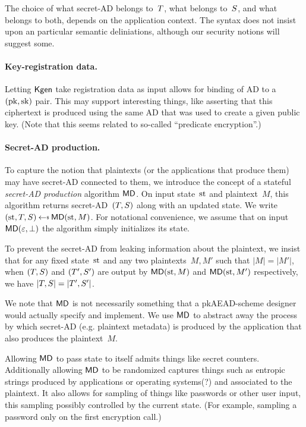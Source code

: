 The choice of what secret-AD belongs to~$T$, what belongs to~$S$, and what belongs to both, depends on the application context.  The syntax does not insist upon an particular semantic deliniations, although our security notions will suggest some.


\paragraph{Key-registration data. } Letting $\mathsf{Kgen}$ take registration data as input allows for binding of AD to a $(\mathrm{pk},\mathrm{sk})$ pair.  This may support interesting things, like asserting that this ciphertext is produced using the same AD that was used to create a given public key.  (Note that this seems related to so-called ``predicate encryption''.)


\paragraph{Secret-AD production. } To capture the notion that plaintexts (or the applications that produce them) may have secret-AD connected to them, we introduce the concept of a stateful \emph{secret-AD production} algorithm $\mathsf{MD}$.  On input state~$\mathrm{st}$ and plaintext~$M$, this algorithm returns secret-AD~$(T,S)$ along with an updated state.  We write $(\st,\umd,\rmd) \getsr \mdalg(\st,M)$.  
For notational convenience, we assume that on input $\mathsf{MD}(\varepsilon,\bot)$ the algorithm simply initializes its state. 

To prevent the secret-AD from leaking information about the plaintext, we insist that for any fixed state~$\mathrm{st}$ and any two plaintexts~$M,M'$ such that $|M|=|M'|$, when $(T,S)$ and $(T',S')$ are output by $\mathsf{MD}(\mathrm{st},M)$ and $\mathsf{MD}(\mathrm{st},M')$ respectively, we have $|T,S|=|T',S'|$. 

We note that $\mathsf{MD}$ is not necessarily something that a pkAEAD-scheme designer would actually specify and implement.  We use $\mathsf{MD}$ to abstract away the process by which secret-AD (e.g. plaintext metadata) is produced by the application that also produces the plaintext~$M$. 

Allowing $\mathsf{MD}$ to pass state to itself admits things like secret counters.  Additionally allowing $\mathsf{MD}$ to be randomized captures things such as entropic strings produced by applications or operating systems(?) and associated to the plaintext.  It also allows for sampling of things like passwords or other user input, this sampling possibly controlled by the current state.  (For example, sampling a password only on the first encryption call.)

